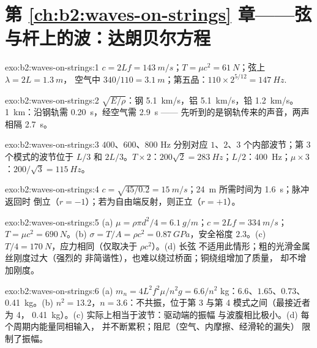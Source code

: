 \section*{第 \ref{ch:b2:waves-on-strings} 章——弦与杆上的波：达朗贝尔方程}

\begin{solution}{exo:b2:waves-on-strings:1}
$c = 2Lf = \qty{143}{m/s}$；$T = \mu c^2 = \qty{61}{N}$；弦上 $\lambda = 2L = \qty{1.3}{m}$，
空气中 $340/110 = \qty{3.1}{m}$；第五品：$110 \times 2^{5/12} =
\qty{147}{Hz}$.
\end{solution}

\begin{solution}{exo:b2:waves-on-strings:2}
$\sqrt{E/\rho}$：钢 \qty{5.1}{km/s}，铝 \qty{5.1}{km/s}，铅
\qty{1.2}{km/s}。\qty{1}{km}：沿钢轨需 \qty{0.20}{s}，经空气需 \qty{2.9}{s} ——
先听到的是钢轨传来的声音，两声相隔 \qty{2.7}{s}。
\end{solution}

\begin{solution}{exo:b2:waves-on-strings:3}
$400$、$600$、$800$ Hz 分别对应 $1$、$2$、$3$ 个内部波节；第 3 个模式的波节位于
$L/3$ 和 $2L/3$。$T \times 2$：$200\sqrt2 = \qty{283}{Hz}$；$L/2$：\qty{400}{Hz}；$\mu
\times 3$：$200/\sqrt3 = \qty{115}{Hz}$。
\end{solution}

\begin{solution}{exo:b2:waves-on-strings:4}
$c = \sqrt{45/0.2} = \qty{15}{m/s}$；\qty{24}{m} 所需时间为 \qty{1.6}{s}；脉冲返回时
倒立（$r = -1$）；若为自由端反射，则正立（$r = +1$）。
\end{solution}

\begin{solution}{exo:b2:waves-on-strings:5}
(a) $\mu = \rho\pi d^2/4 = \qty{6.1}{g/m}$；$c = 2Lf = \qty{334}{m/s}$；$T = \mu c^2 =
\qty{690}{N}$。(b) $\sigma = T/A = \rho c^2 = \qty{0.87}{GPa}$，安全裕度 $2.3$。(c) $T/4 =
\qty{170}{N}$，应力相同（仅取决于 $\rho c^2$）。(d) 长弦
不适用此情形；粗的光滑金属丝刚度过大（强烈的
非简谐性），也难以绕过桥面；铜绕组增加了质量，
却不增加刚度。
\end{solution}

\begin{solution}{exo:b2:waves-on-strings:6}
(a) $m_n = 4L^2f^2\mu/n^2g = 6.6/n^2$ kg：$6.6$、$1.65$、$0.73$、\qty{0.41}{kg}。(b)
$n^2 = 13.2$，$n = 3.6$：不共振，位于第 3 与第 4 模式之间（最接近者为 4，
\qty{0.41}{kg}）。(c) 实际上相当于波节：驱动端的振幅
与波腹相比极小。(d) 每个周期内能量同相输入，
并不断累积；阻尼（空气、内摩擦、经滑轮的漏失）
限制了振幅。
\end{solution}

